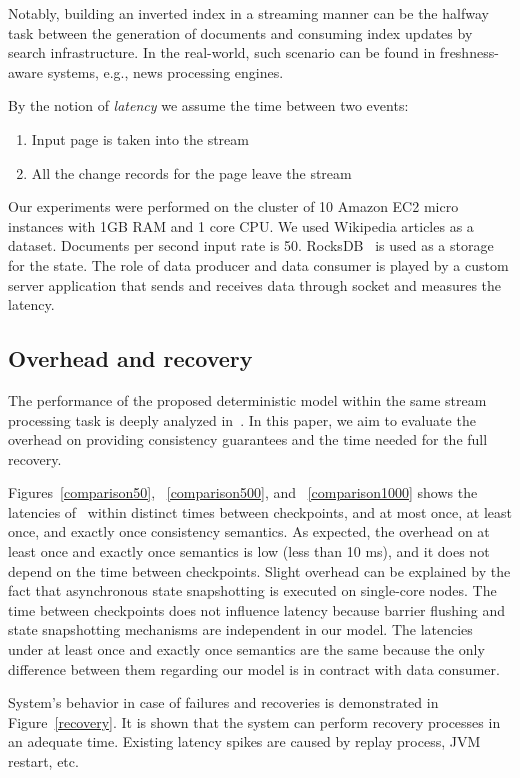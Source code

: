 Notably, building an inverted index in a streaming manner can be the halfway task between the generation of documents and consuming index updates by search infrastructure. In the real-world, such scenario can be found in freshness-aware systems, e.g., news processing engines.

By the notion of {\it latency} we assume the time between two events: 

\begin{enumerate}
    \item Input page is taken into the stream
    \item All the change records for the page leave the stream
\end{enumerate}

Our experiments were performed on the cluster of 10 Amazon EC2 micro instances with 1GB RAM and 1 core CPU. We used Wikipedia articles as a dataset. Documents per second input rate is 50. RocksDB~\cite{rocksdb} is used as a storage for the state. The role of data producer and data consumer is played by a custom server application that sends and receives data through socket and measures the latency.

\subsection{Overhead and recovery}
The performance of the proposed deterministic model within the same stream processing task is deeply analyzed in~\cite{hiddenSeim}. In this paper, we aim to evaluate the overhead on providing consistency guarantees and the time needed for the full recovery.

Figures~\ref{comparison50}, ~\ref{comparison500}, and ~\ref{comparison1000} shows the latencies of \FlameStream\ within distinct times between checkpoints, and at most once, at least once, and exactly once consistency semantics. As expected, the overhead on at least once and exactly once semantics is low (less than 10 ms), and it does not depend on the time between checkpoints. Slight overhead can be explained by the fact that asynchronous state snapshotting is executed on single-core nodes. The time between checkpoints does not influence latency because barrier flushing and state snapshotting mechanisms are independent in our model. The latencies under at least once and exactly once semantics are the same because the only difference between them regarding our model is in contract with data consumer.

System's behavior in case of failures and recoveries is demonstrated in Figure~\ref{recovery}. It is shown that the system can perform recovery processes in an adequate time. Existing latency spikes are caused by replay process, JVM restart, etc.

